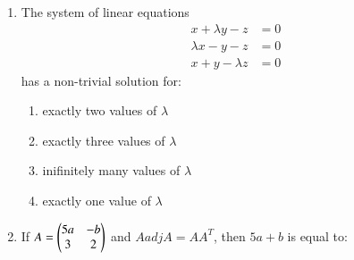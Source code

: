 \documentclass[journal,12pt,twocolumn]{IEEEtran}
\theoremstyle{remark}
\begin{document}
\begin{enumerate}
\begin{enumerate}
	\end{enumerate}


	\item The system of linear equations 
	\begin{align*}
		x+\lambda y-z &= 0\\
		\lambda x-y-z &= 0\\
		x+y-\lambda z &= 0
	\end{align*}
	has a non-trivial solution for:

	\hfill{}
	\begin{enumerate}
		\item exactly two values of $\lambda$ 
		\item exactly three values of $\lambda$ 
		\item inifinitely many values of $\lambda$
		\item exactly one value of $\lambda$ 
	\end{enumerate}


	\item If $A = \begin{pmatrix}5a&-b\\3&2\end{pmatrix}$ and $A adj A = AA^{T}$, then $5a + b$ is equal to: 
	\hfill{}
	\begin{enumerate}

	\end{enumerate}


\end{enumerate}
\end{document}
